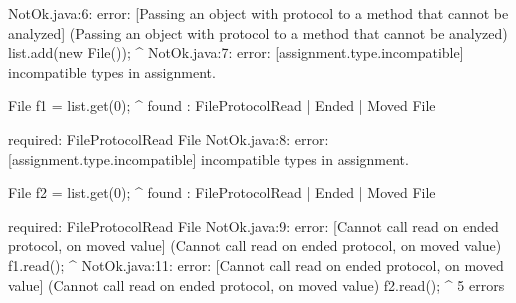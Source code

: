 \lstset{language=,caption=New Mungo output}
\begin{code}
NotOk.java:6: error: [Passing an object with protocol to a method that cannot be analyzed] (Passing an object with protocol to a method that cannot be analyzed)
    list.add(new File());
             ^
NotOk.java:7: error: [assignment.type.incompatible] incompatible types in assignment.

    File f1 = list.get(0);
                      ^
  found   : FileProtocol{Read} | Ended | Moved File

  required: FileProtocol{Read} File
NotOk.java:8: error: [assignment.type.incompatible] incompatible types in assignment.

    File f2 = list.get(0);
                      ^
  found   : FileProtocol{Read} | Ended | Moved File

  required: FileProtocol{Read} File
NotOk.java:9: error: [Cannot call read on ended protocol, on moved value] (Cannot call read on ended protocol, on moved value)
    f1.read();
           ^
NotOk.java:11: error: [Cannot call read on ended protocol, on moved value] (Cannot call read on ended protocol, on moved value)
    f2.read();
           ^
5 errors
\end{code}

